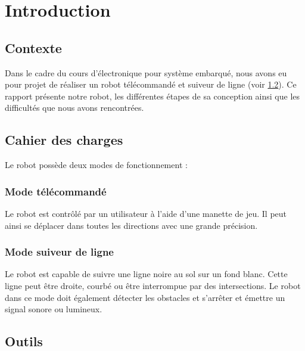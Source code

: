\chapter{Introduction}

\section{Contexte}

Dans le cadre du cours d'électronique pour système embarqué,
nous avons eu pour projet de réaliser un robot télécommandé et suiveur de ligne (voir \ref{cahier_des_charges}).
Ce rapport présente notre robot, les différentes étapes de sa conception ainsi que les difficultés que nous avons rencontrées.

\section{Cahier des charges} \label{cahier_des_charges}

Le robot possède deux modes de fonctionnement :

\subsection{Mode télécommandé}

Le robot est contrôlé par un utilisateur à l'aide d'une manette de jeu.
Il peut ainsi se déplacer dans toutes les directions avec une grande précision.

\subsection{Mode suiveur de ligne}

Le robot est capable de suivre une ligne noire au sol sur un fond blanc.
Cette ligne peut être droite, courbé ou être interrompue par des intersections.
Le robot dans ce mode doit également détecter les obstacles et s'arrêter et émettre un signal sonore ou lumineux.

\section{Outils}

